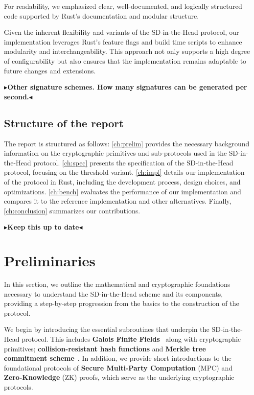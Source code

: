 \documentclass[twoside,11pt]{report}
\theoremstyle{definition}
\theoremstyle{plain}
\newcommand{\todo}[1]{{\color[rgb]{.5,0,0}\textbf{$\blacktriangleright$#1$\blacktriangleleft$}}}
\begin{document}
For readability, we emphasized clear, well-documented, and logically structured code supported by Rust's documentation and modular structure.

Given the inherent flexibility and variants of the SD-in-the-Head protocol, our implementation leverages Rust's feature flags and build time scripts to enhance modularity and interchangeability. This approach not only supports a high degree of configurability but also ensures that the implementation remains adaptable to future changes and extensions.

\todo{Other signature schemes. How many signatures can be generated per second.}

\section{Structure of the report}
The report is structured as follows: \autoref{ch:prelim} provides the necessary background information on the cryptographic primitives and sub-protocols used in the SD-in-the-Head protocol. \autoref{ch:spec} presents the specification of the SD-in-the-Head protocol, focusing on the threshold variant. \autoref{ch:impl} details our implementation of the protocol in Rust, including the development process, design choices, and optimizations. \autoref{ch:bench} evaluates the performance of our implementation and compares it to the reference implementation and other alternatives. Finally, \autoref{ch:conclusion} summarizes our contributions.

\todo{Keep this up to date}


\chapter{Preliminaries}\label{ch:prelim}

In this section, we outline the mathematical and cryptographic foundations necessary to understand the SD-in-the-Head scheme and its components, providing a step-by-step progression from the basics to the construction of the protocol.

We begin by introducing the essential subroutines that underpin the SD-in-the-Head protocol. This includes \textbf{Galois Finite Fields}~\cite{martinez2023syndromes, reed1960polynomial, brownadvanced} along with cryptographic primitives; \textbf{collision-resistant hash functions} and \textbf{Merkle tree commitment scheme}~\cite{becker2008merkle}. In addition, we provide short introductions to the foundational protocols of \textbf{Secure Multi-Party Computation} (MPC) and \textbf{Zero-Knowledge} (ZK) proofs, which serve as the underlying cryptographic protocols.
\end{document}
